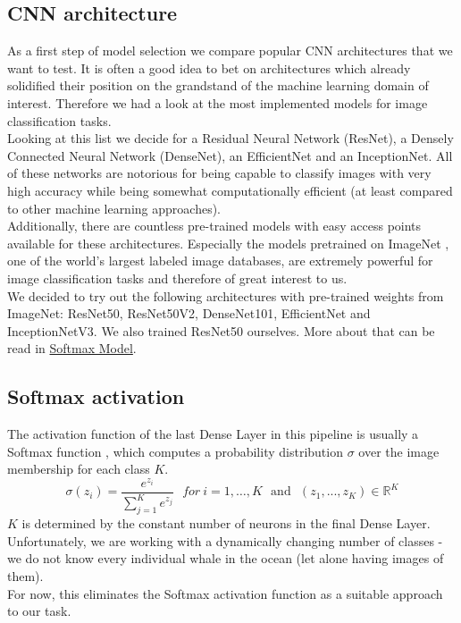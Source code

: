 \subsection{CNN architecture} \label{subsec:cnn}
As a first step of model selection we compare popular CNN architectures that we want to test. It is often a good idea to bet on architectures which already solidified their position on the grandstand of the machine learning domain of interest. Therefore we had a look at the most implemented models for image classification tasks. \\
Looking at this list we decide for a Residual Neural Network (ResNet), a Densely Connected Neural Network (DenseNet), an EfficientNet and an InceptionNet. \cite{paperswithcode}
All of these networks are notorious for being capable to classify images with very high accuracy while being somewhat computationally efficient (at least compared to other machine learning approaches). \\ 
Additionally, there are countless pre-trained models with easy access points available for these architectures. Especially the models pretrained on ImageNet \cite{deng2009imagenet}, one of the world's largest labeled image databases, are extremely powerful for image classification tasks and therefore of great interest to us. \\
We decided to try out the following architectures with pre-trained weights from ImageNet: ResNet50, ResNet50V2, DenseNet101, EfficientNet and InceptionNetV3. We also trained ResNet50 ourselves. More about that can be read in \hyperref[sec:softmax-model]{Softmax Model}.

\subsection{Softmax activation}
The activation function of the last Dense Layer in this pipeline is usually a Softmax function , which computes a probability distribution \(\sigma\) over the image membership for each class \(K\).
\[ \sigma(z_i) = \frac{e^{z_{i}}}{\sum_{j=1}^K e^{z_{j}}} \ \ \ for\ i=1, \dots, K \ \ \ \text{and} \ \ \ (z_1, ..., z_K) \in \mathbb{R}^K \]
\(K\) is determined by the constant number of neurons in the final Dense Layer.
Unfortunately, we are working with a dynamically changing number of classes - we do not know every individual whale in the ocean (let alone having images of them). \\
For now, this eliminates the Softmax activation function as a suitable approach to our task. \\

